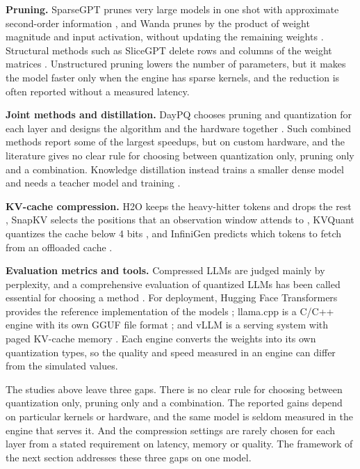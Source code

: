 \documentclass[num-refs]{wiley-article}
\begin{document}
\textbf{Pruning.} SparseGPT prunes very large models in one shot with approximate second-order information \cite{frantar2023sparsegpt}, and Wanda prunes by the product of weight magnitude and input activation, without updating the remaining weights \cite{sun2024wanda}. Structural methods such as SliceGPT delete rows and columns of the weight matrices \cite{ashkboos2024slicegpt}. Unstructured pruning lowers the number of parameters, but it makes the model faster only when the engine has sparse kernels, and the reduction is often reported without a measured latency.

\textbf{Joint methods and distillation.} DayPQ chooses pruning and quantization for each layer and designs the algorithm and the hardware together \cite{xu2026daypq}. Such combined methods report some of the largest speedups, but on custom hardware, and the literature gives no clear rule for choosing between quantization only, pruning only and a combination. Knowledge distillation instead trains a smaller dense model and needs a teacher model and training \cite{gu2024minillm}.

\textbf{KV-cache compression.} H2O keeps the heavy-hitter tokens and drops the rest \cite{zhang2023h2o}, SnapKV selects the positions that an observation window attends to \cite{li2024snapkv}, KVQuant quantizes the cache below 4 bits \cite{hooper2024kvquant}, and InfiniGen predicts which tokens to fetch from an offloaded cache \cite{lee2024infinigen}.

\textbf{Evaluation metrics and tools.} Compressed LLMs are judged mainly by perplexity, and a comprehensive evaluation of quantized LLMs has been called essential for choosing a method \cite{li2024evaluating}. For deployment, Hugging Face Transformers provides the reference implementation of the models \cite{wolf2020transformers}; llama.cpp is a C/C++ engine with its own GGUF file format \cite{ggml2025llamacpp,ggml2025gguf}; and vLLM is a serving system with paged KV-cache memory \cite{kwon2023vllm}. Each engine converts the weights into its own quantization types, so the quality and speed measured in an engine can differ from the simulated values.

The studies above leave three gaps. There is no clear rule for choosing between quantization only, pruning only and a combination. The reported gains depend on particular kernels or hardware, and the same model is seldom measured in the engine that serves it. And the compression settings are rarely chosen for each layer from a stated requirement on latency, memory or quality. The framework of the next section addresses these three gaps on one model.
\end{document}
